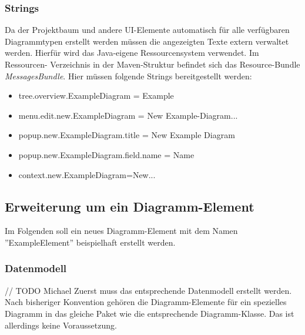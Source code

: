 \subsubsection{Strings}
Da der Projektbaum und andere UI-Elemente automatisch für alle verfügbaren Diagrammtypen erstellt werden müssen
die angezeigten Texte extern verwaltet werden. Hierfür wird das Java-eigene Ressourcensystem verwendet. Im Ressourcen-
Verzeichnis in der Maven-Struktur befindet sich das Resource-Bundle \textit{MessagesBundle}. Hier müssen folgende Strings
bereitgestellt werden:

\begin{itemize}
	\item tree.overview.ExampleDiagram = Example
	\item menu.edit.new.ExampleDiagram = New Example-Diagram...
	\item popup.new.ExampleDiagram.title = New Example Diagram
	\item popup.new.ExampleDiagram.field.name = Name
	\item context.new.ExampleDiagram=New...
\end{itemize}

\pagebreak
\subsection{Erweiterung um ein Diagramm-Element}
\label{add_element}
Im Folgenden soll ein neues Diagramm-Element mit dem Namen ''ExampleElement'' beispielhaft erstellt werden.

\subsubsection{Datenmodell}
// TODO Michael
Zuerst muss das entsprechende Datenmodell erstellt werden. Nach bisheriger Konvention gehören die Diagramm-Elemente
für ein spezielles Diagramm in das gleiche Paket wie die entsprechende Diagramm-Klasse. Das ist allerdings keine
Voraussetzung.

